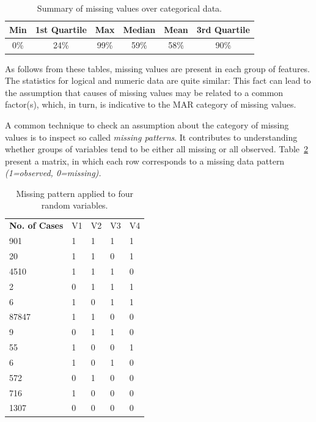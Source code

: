  \begin{table}[h!]
  \begin{center}
    \caption{Summary of missing values over categorical data.}
    \label{tab:missings-over-categorical}
    \begin{tabular}{c|c|c|c|c|c}
    Min & 1st Quartile & Max & Median & Mean & 3rd Quartile \\
      \hline
     0\% & 24\% & 99\% & 59\% & 58\% & 90\% \\ 
     \hline 
    \end{tabular}
  \end{center}
\end{table}

As follows from these tables, missing values are present in each group of features. The statistics for logical and numeric data are quite similar: This fact can lead to the assumption that causes of missing values may be related to a common factor(s), which, in turn, is indicative to the MAR category of missing values.

A common technique to check an assumption about the category of missing values is to inspect so called \textit{missing patterns}. It contributes to understanding whether groups of variables tend to be either all missing or all observed. Table~\ref{tab:variable-pattern-example} present a matrix, in which each row corresponds to a missing data pattern \textit{(1=observed, 0=missing).} 

\begin{table}[h!]
\centering
\caption{Missing pattern applied to four random variables.}
\label{tab:variable-pattern-example}
\begin{tabular}{lllll}
\textbf{No. of Cases} & V1 & V2 & V3 & V4 \\
901             & 1           & 1           & 1           & 1           \\
20              & 1           & 1           & 0           & 1           \\
4510            & 1           & 1           & 1           & 0           \\
2               & 0           & 1           & 1           & 1           \\
6               & 1           & 0           & 1           & 1           \\
87847           & 1           & 1           & 0           & 0           \\
9               & 0           & 1           & 1           & 0           \\
55              & 1           & 0           & 0           & 1           \\
6               & 1           & 0           & 1           & 0           \\
572             & 0           & 1           & 0           & 0           \\
716             & 1           & 0           & 0           & 0           \\
1307            & 0           & 0           & 0           & 0          
\end{tabular}
\end{table}

